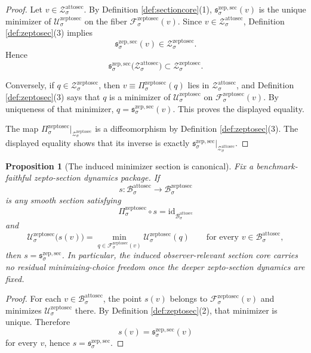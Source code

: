 \documentclass[11pt]{article}
\newcommand{\AttoSectionBody}[1]{\mathcal B_{#1}^{\mathrm{attosec}}}
\newcommand{\AttoSectionShell}[1]{\mathcal Z_{#1}^{\mathrm{attosec}}}
\newcommand{\ZeptoSectionBody}[1]{\mathcal B_{#1}^{\mathrm{zeptosec}}}
\newcommand{\ZeptoSectionProj}[1]{\Pi_{#1}^{\mathrm{zeptosec}}}
\newcommand{\ZeptoSectionFiber}[2]{\mathcal F_{#1}^{\mathrm{zeptosec}}(#2)}
\newcommand{\ZeptoSectionFunctional}[1]{\mathscr U_{#1}^{\mathrm{zeptosec}}}
\newcommand{\ZeptoSectionShell}[1]{\mathcal Z_{#1}^{\mathrm{zeptosec}}}
\newcommand{\ZeptoMinSection}[1]{\mathfrak s_{#1}^{\mathrm{zep,sec}}}
\newtheorem{proposition}{Proposition}
\begin{document}
\begin{proof}
Let \(v\in\AttoSectionShell{\sigma}\). By Definition \ref{def:sectioncore}(1), \(\ZeptoMinSection{\sigma}(v)\) is the unique minimizer of \(\ZeptoSectionFunctional{\sigma}\) on the fiber \(\ZeptoSectionFiber{\sigma}{v}\). Since \(v\in\AttoSectionShell{\sigma}\), Definition \ref{def:zeptosec}(3) implies
\[
\ZeptoMinSection{\sigma}(v)\in\ZeptoSectionShell{\sigma}.
\]
Hence
\[
\ZeptoMinSection{\sigma}\bigl(\AttoSectionShell{\sigma}\bigr)\subset\ZeptoSectionShell{\sigma}.
\]

Conversely, if \(q\in\ZeptoSectionShell{\sigma}\), then \(v\equiv\ZeptoSectionProj{\sigma}(q)\) lies in \(\AttoSectionShell{\sigma}\), and Definition \ref{def:zeptosec}(3) says that \(q\) is a minimizer of \(\ZeptoSectionFunctional{\sigma}\) on \(\ZeptoSectionFiber{\sigma}{v}\). By uniqueness of that minimizer, \(q=\ZeptoMinSection{\sigma}(v)\). This proves the displayed equality.

The map \(\ZeptoSectionProj{\sigma}\big|_{\ZeptoSectionShell{\sigma}}\) is a diffeomorphism by Definition \ref{def:zeptosec}(3). The displayed equality shows that its inverse is exactly \(\ZeptoMinSection{\sigma}\big|_{\AttoSectionShell{\sigma}}\).
\end{proof}

\begin{proposition}[The induced minimizer section is canonical]
\label{prop:canonical}
Fix a benchmark-faithful zepto-section dynamics package. If
\[
s:\AttoSectionBody{\sigma}\to\ZeptoSectionBody{\sigma}
\]
is any smooth section satisfying
\[
\ZeptoSectionProj{\sigma}\circ s
=
\mathrm{id}_{\AttoSectionBody{\sigma}}
\]
and
\[
\ZeptoSectionFunctional{\sigma}\bigl(s(v)\bigr)
=
\min_{q\in\ZeptoSectionFiber{\sigma}{v}}
\ZeptoSectionFunctional{\sigma}(q)
\qquad
\text{for every }
v\in\AttoSectionBody{\sigma},
\]
then \(s=\ZeptoMinSection{\sigma}\). In particular, the induced observer-relevant section core carries no residual minimizing-choice freedom once the deeper zepto-section dynamics are fixed.
\end{proposition}

\begin{proof}
For each \(v\in\AttoSectionBody{\sigma}\), the point \(s(v)\) belongs to \(\ZeptoSectionFiber{\sigma}{v}\) and minimizes \(\ZeptoSectionFunctional{\sigma}\) there. By Definition \ref{def:zeptosec}(2), that minimizer is unique. Therefore
\[
s(v)=\ZeptoMinSection{\sigma}(v)
\]
for every \(v\), hence \(s=\ZeptoMinSection{\sigma}\).
\end{proof}
\end{document}
